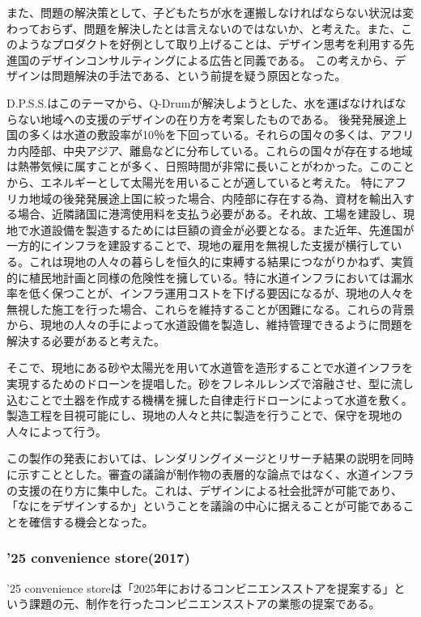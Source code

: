 \documentclass{jsarticle}
\begin{document}
また、問題の解決策として、子どもたちが水を運搬しなければならない状況は変わっておらず、問題を解決したとは言えないのではないか、と考えた。また、このようなプロダクトを好例として取り上げることは、デザイン思考を利用する先進国のデザインコンサルティングによる広告と同義である。
この考えから、デザインは問題解決の手法である、という前提を疑う原因となった。

D.P.S.S.はこのテーマから、Q-Drumが解決しようとした、水を運ばなければならない地域への支援のデザインの在り方を考案したものである。
後発発展途上国の多くは水道の敷設率が10％を下回っている。それらの国々の多くは、アフリカ内陸部、中央アジア、離島などに分布している。これらの国々が存在する地域は熱帯気候に属すことが多く、日照時間が非常に長いことがわかった。このことから、エネルギーとして太陽光を用いることが適していると考えた。
特にアフリカ地域の後発発展途上国に絞った場合、内陸部に存在する為、資材を輸出入する場合、近隣諸国に港湾使用料を支払う必要がある。それ故、工場を建設し、現地で水道設備を製造するためには巨額の資金が必要となる。また近年、先進国が一方的にインフラを建設することで、現地の雇用を無視した支援が横行している。これは現地の人々の暮らしを恒久的に束縛する結果につながりかねず、実質的に植民地計画と同様の危険性を擁している。特に水道インフラにおいては漏水率を低く保つことが、インフラ運用コストを下げる要因になるが、現地の人々を無視した施工を行った場合、これらを維持することが困難になる。これらの背景から、現地の人々の手によって水道設備を製造し、維持管理できるように問題を解決する必要があると考えた。

そこで、現地にある砂や太陽光を用いて水道管を造形することで水道インフラを実現するためのドローンを提唱した。砂をフレネルレンズで溶融させ、型に流し込むことで土器を作成する機構を擁した自律走行ドローンによって水道を敷く。製造工程を目視可能にし、現地の人々と共に製造を行うことで、保守を現地の人々によって行う。

この製作の発表においては、レンダリングイメージとリサーチ結果の説明を同時に示すこととした。審査の議論が制作物の表層的な論点ではなく、水道インフラの支援の在り方に集中した。これは、デザインによる社会批評が可能であり、「なにをデザインするか」ということを議論の中心に据えることが可能であることを確信する機会となった。


\subsubsection{’25 convenience store(2017)}
 ’25 convenience storeは「2025年におけるコンビニエンスストアを提案する」という課題の元、制作を行ったコンビニエンスストアの業態の提案である。
\end{document}
